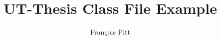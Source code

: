 \documentclass{ut-thesis}
\author{Fran\c{c}ois Pitt}
\title{UT-Thesis Class File Example}
\begin{document}
\begin{preliminary}

\maketitle


\begin{abstract}
\end{abstract}





\tableofcontents




\end{preliminary}
\end{document}
